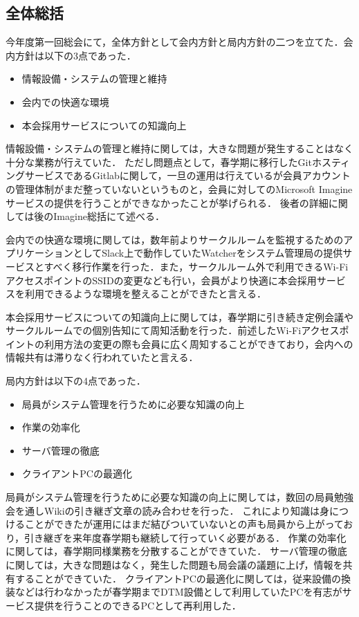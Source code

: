 \subsection*{全体総括}


今年度第一回総会にて，全体方針として会内方針と局内方針の二つを立てた．会内方針は以下の3点であった．
\begin{itemize}
  \item 情報設備・システムの管理と維持
  \item 会内での快適な環境
  \item 本会採用サービスについての知識向上
\end{itemize}

情報設備・システムの管理と維持に関しては，大きな問題が発生することはなく十分な業務が行えていた．
ただし問題点として，春学期に移行したGitホスティングサービスであるGitlabに関して，一旦の運用は行えているが会員アカウントの管理体制がまだ整っていないというものと，会員に対してのMicrosoft Imagineサービスの提供を行うことができなかったことが挙げられる．
後者の詳細に関しては後のImagine総括にて述べる．

会内での快適な環境に関しては，数年前よりサークルルームを監視するためのアプリケーションとしてSlack上で動作していたWatcherをシステム管理局の提供サービスとすべく移行作業を行った．また，サークルルーム外で利用できるWi-FiアクセスポイントのSSIDの変更なども行い，会員がより快適に本会採用サービスを利用できるような環境を整えることができたと言える．

本会採用サービスについての知識向上に関しては，春学期に引き続き定例会議やサークルルームでの個別告知にて周知活動を行った．前述したWi-Fiアクセスポイントの利用方法の変更の際も会員に広く周知することができており，会内への情報共有は滞りなく行われていたと言える．

局内方針は以下の4点であった．
\begin{itemize}
  \item 局員がシステム管理を行うために必要な知識の向上
  \item 作業の効率化
  \item サーバ管理の徹底
  \item クライアントPCの最適化
\end{itemize}

局員がシステム管理を行うために必要な知識の向上に関しては，数回の局員勉強会を通しWikiの引き継ぎ文章の読み合わせを行った．
これにより知識は身につけることができたが運用にはまだ結びついていないとの声も局員から上がっており，引き継ぎを来年度春学期も継続して行っていく必要がある．
作業の効率化に関しては，春学期同様業務を分散することができていた．
サーバ管理の徹底に関しては，大きな問題はなく，発生した問題も局会議の議題に上げ，情報を共有することができていた．
クライアントPCの最適化に関しては，従来設備の換装などは行わなかったが春学期までDTM設備として利用していたPCを有志がサービス提供を行うことのできるPCとして再利用した．
